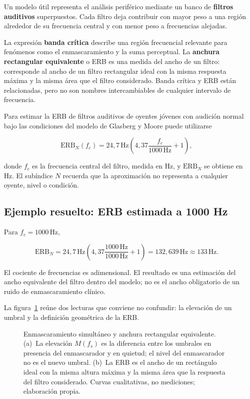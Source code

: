 Un modelo útil representa el análisis periférico mediante un banco de
\textbf{filtros auditivos} superpuestos. Cada filtro deja contribuir con mayor
peso a una región alrededor de su frecuencia central y con menor peso a
frecuencias alejadas.

La expresión \textbf{banda crítica} describe una región frecuencial relevante
para fenómenos como el enmascaramiento y la suma perceptual. La
\textbf{anchura rectangular equivalente} o ERB es una medida del ancho de un
filtro: corresponde al ancho de un filtro rectangular ideal con la misma
respuesta máxima y la misma área que el filtro considerado. Banda crítica y
ERB están relacionadas, pero no son nombres intercambiables de cualquier
intervalo de frecuencia.

Para estimar la ERB de filtros auditivos de oyentes jóvenes con
audición normal bajo las condiciones del modelo de Glasberg y Moore puede
utilizarse~\cite{glasbergMoore1990}

\begin{equation}
    \mathrm{ERB}_{N}(f_c)
      =24{,}7\,\text{Hz}
       \left(
       4{,}37\frac{f_c}{1000\,\text{Hz}}+1
       \right),
    \label{eq:u7-erb}
\end{equation}

donde \(f_c\) es la frecuencia central del filtro, medida en
\(\text{Hz}\), y \(\mathrm{ERB}_{N}\) se obtiene en \(\text{Hz}\). El
subíndice \(N\) recuerda que la aproximación no representa a cualquier oyente,
nivel o condición.

\subsection{Ejemplo resuelto: ERB estimada a 1000 Hz}
\label{sec:u7-ejemplo-erb}

Para \(f_c=1000\,\text{Hz}\),

\[
    \mathrm{ERB}_{N}
      =24{,}7\,\text{Hz}
       \left(
       4{,}37\frac{1000\,\text{Hz}}{1000\,\text{Hz}}+1
       \right)
      =132{,}639\,\text{Hz}
      \approx133\,\text{Hz}.
\]

El cociente de frecuencias es adimensional. El resultado es una estimación del
ancho equivalente del filtro dentro del modelo; no es el ancho obligatorio de
un ruido de enmascaramiento clínico.

La figura~\ref{fig:u7-enmascaramiento-erb} reúne dos lecturas que conviene no
confundir: la elevación de un umbral y la definición geométrica de la ERB.

\begin{figure}[htbp]
    \centering
    
    \caption{Enmascaramiento simultáneo y anchura rectangular equivalente.
    (a)~La elevación \(M(f_s)\) es la diferencia entre los umbrales en presencia
    del enmascarador y en quietud; el nivel del enmascarador no es el nuevo
    umbral. (b)~La ERB es el ancho de un rectángulo ideal con la misma altura
    máxima y la misma área que la respuesta del filtro considerado. Curvas
    cualitativas, no mediciones; elaboración propia.}
    \label{fig:u7-enmascaramiento-erb}
\end{figure}

